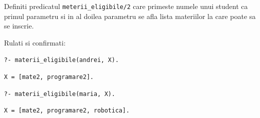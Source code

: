Definiti predicatul \texttt{meterii\_eligibile/2} care primeste numele unui student ca primul parametru si in al doilea parametru se afla lista materiilor la care poate sa se inscrie.

Rulati si confirmati:

\texttt{?- materii\_eligibile(andrei, X).}

\texttt{X = [mate2, programare2].}

\texttt{?- materii\_eligibile(maria, X).}

\texttt{X = [mate2, programare2, robotica].}
